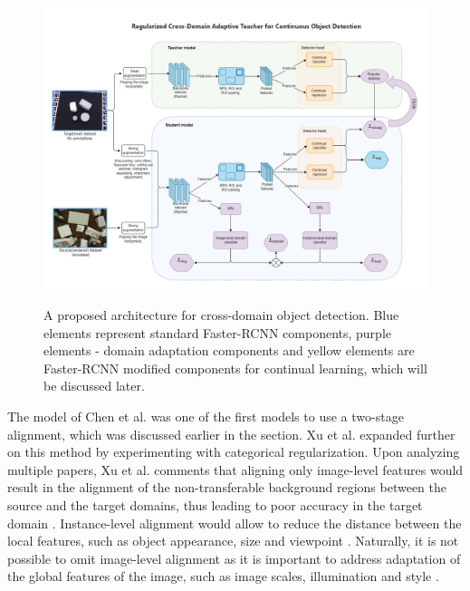 \begin{figure}[htb]
	\begin{center}
		\includegraphics[width=16cm]{./MyModel.png}
	\end{center}
	\caption{A proposed architecture for cross-domain object detection. Blue elements represent standard Faster-RCNN components, purple elements - domain adaptation components and yellow elements are Faster-RCNN modified components for continual learning, which will be discussed later.}
	\begin{center}
		\label{mymodel}
	\end{center}
\end{figure}

The model of Chen et al. \cite{Chen2018} was one of the first models to use a two-stage alignment, which was discussed earlier in the  section. Xu et al. \cite{Xu2020} expanded further on this method by experimenting with categorical regularization. Upon analyzing multiple papers, Xu et al. comments that aligning only image-level features would result in the alignment of the non-transferable background regions between the source and the target domains, thus leading to poor accuracy in the target domain \cite{Xu2020}. Instance-level alignment would allow to reduce the distance between the local features, such as object appearance, size and viewpoint \cite{Chen2018}. Naturally, it is not possible to omit image-level alignment as it is important to address adaptation of the global features of the image, such as image scales, illumination and style \cite{Chen2018}. 

